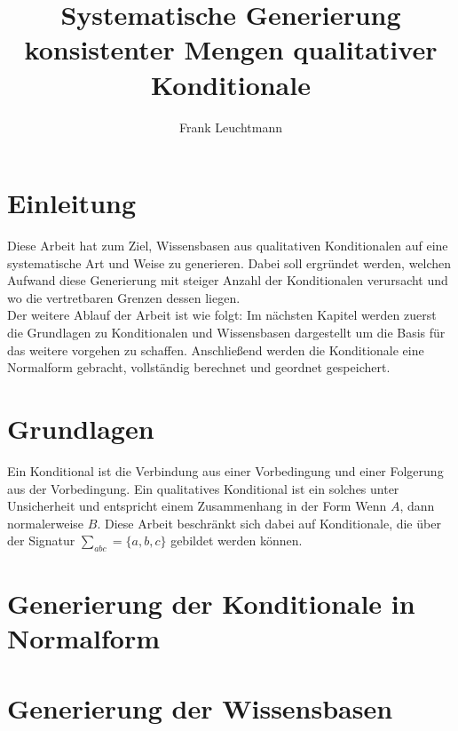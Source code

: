 \documentclass[12pt,a4paper]{article}
\author{Frank Leuchtmann}
\title{Systematische Generierung konsistenter Mengen qualitativer
Konditionale}
\begin{document}
\maketitle
\newpage
\tableofcontents
\newpage
\section{Einleitung}
Diese Arbeit hat zum Ziel, Wissensbasen aus qualitativen Konditionalen auf eine systematische Art und Weise zu generieren. Dabei soll ergründet werden, welchen Aufwand diese Generierung mit steiger Anzahl der Konditionalen verursacht und wo die vertretbaren Grenzen dessen liegen.
\\
Der weitere Ablauf der Arbeit ist wie folgt: Im nächsten Kapitel werden zuerst die Grundlagen zu Konditionalen und Wissensbasen dargestellt um die Basis für das weitere vorgehen zu schaffen. Anschließend werden die Konditionale eine Normalform gebracht, vollständig berechnet und geordnet gespeichert.
\section{Grundlagen}
Ein Konditional ist die Verbindung aus einer Vorbedingung und einer Folgerung aus der Vorbedingung. Ein qualitatives Konditional ist ein solches unter  Unsicherheit und entspricht einem Zusammenhang in der Form \grqq Wenn $A$, dann normalerweise $B$\grqq .
Diese Arbeit beschränkt sich dabei auf Konditionale, die über der Signatur $\sum_{abc} = \{a, b, c\}$ gebildet werden können.
\cite{beierle17}
\section{Generierung der Konditionale in Normalform}
\section{Generierung der Wissensbasen}


 
\end{document}
